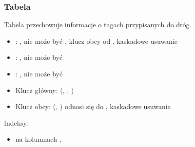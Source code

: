 \subsubsection{Tabela }
Tabela przechowuje informacje o tagach przypisanych do dróg.
\begin{itemize}
    \item {}: , nie może być , klucz obcy od , kaskadowe usuwanie
    \item {}: , nie może być 
    \item {}: , nie może być 
    \item Klucz główny: (, , )
    \item Klucz obcy: (, ) odnosi się do , kaskadowe usuwanie
\end{itemize}
Indeksy:
\begin{itemize}
    \item {} na kolumnach , 
\end{itemize}
